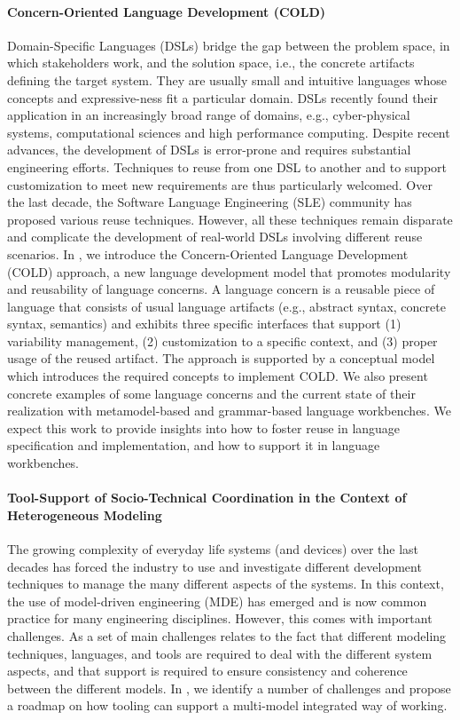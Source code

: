 \paragraph{Concern-Oriented Language Development (COLD)}

Domain-Specific Languages (DSLs) bridge the gap between the problem space, in which stakeholders work, and the solution space, i.e., the concrete artifacts defining the target system. They are usually small and intuitive languages whose concepts and expressive-ness fit a particular domain. DSLs recently found their application in an increasingly broad range of domains, e.g., cyber-physical systems, computational sciences and high performance computing. Despite recent advances, the development of DSLs is error-prone and requires substantial engineering efforts. Techniques to reuse from one DSL to another and to support customization to meet new requirements are thus particularly welcomed. Over the last decade, the Software Language Engineering (SLE) community has proposed various reuse techniques. However, all these techniques remain disparate and complicate the development of real-world DSLs involving different reuse scenarios. In \cite{combemale:hal-01803008}, we introduce the Concern-Oriented Language Development (COLD) approach, a new language development model that promotes modularity and reusability of language concerns. A language concern is a reusable piece of language that consists of usual language artifacts (e.g., abstract syntax, concrete syntax, semantics) and exhibits three specific interfaces that support (1) variability management, (2) customization to a specific context, and (3) proper usage of the reused artifact. The approach is supported by a conceptual model which introduces the required concepts to implement COLD. We also present concrete examples of some language concerns and the current state of their realization with metamodel-based and grammar-based language workbenches. We expect this work to provide insights into how to foster reuse in language specification and implementation, and how to support it in language workbenches.

\paragraph{Tool-Support of Socio-Technical Coordination in the Context of Heterogeneous Modeling}

The growing complexity of everyday life systems (and devices) over the last decades has forced the industry to use and investigate different development techniques to manage the many different aspects of the systems. In this context, the use of model-driven engineering (MDE) has emerged and is now common practice for many engineering disciplines. However, this comes with important challenges. As a set of main challenges relates to the fact that different modeling techniques, languages, and tools are required to deal with the different system aspects, and that support is required to ensure consistency and coherence between the different models. In \cite{bordeleau:hal-01958443}, we identify a number of challenges and propose a roadmap on how tooling can support a multi-model integrated way of working.